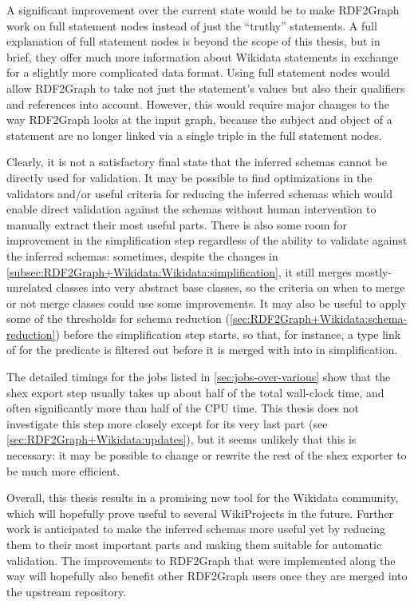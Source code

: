 A significant improvement over the current state
would be to make \gls{RDF2Graph} work on full \gls{statement} nodes instead of just the “truthy” \glspl{statement}.
A full explanation of full \gls{statement} nodes is beyond the scope of this thesis,
but in brief, they offer much more information about \gls{Wikidata} \glspl{statement}
in exchange for a slightly more complicated data format.
Using full \gls{statement} nodes would allow \gls{RDF2Graph} to take not just the \gls{statement}’s values
but also their \glspl{qualifier} and \glspl{reference} into account.
However, this would require major changes to the way \gls{RDF2Graph} looks at the input graph,
because the \gls{subject} and \gls{object} of a \gls{statement} are no longer linked via a single \gls{triple}
in the full \gls{statement} nodes.

Clearly, it is not a satisfactory final state
that the inferred \glspl{schema} cannot be directly used for validation.
It may be possible to find optimizations in the validators
and/or useful criteria for reducing the inferred \glspl{schema}
which would enable direct validation against the \glspl{schema}
without human intervention to manually extract their most useful parts.
There is also some room for improvement in the simplification step
regardless of the ability to validate against the inferred \glspl{schema}:
sometimes, despite the changes in \cref{subsec:RDF2Graph+Wikidata:Wikidata:simplification},
it still merges mostly-unrelated classes into very abstract base classes,
so the criteria on when to merge or not merge classes could use some improvements.
It may also be useful to apply some of the thresholds for schema reduction (\cref{sec:RDF2Graph+Wikidata:schema-reduction})
before the simplification step starts,
so that, for instance,
a \gls{type link} of  for the  \gls{predicate}
is filtered out before it is merged with  into  in simplification.

The detailed timings for the jobs listed in \cref{sec:jobs-over-various}
show that the \gls{shex} export step usually takes up about half of the total wall-clock time,
and often significantly more than half of the CPU time.
This thesis does not investigate this step more closely except for its very last part
(see \cref{sec:RDF2Graph+Wikidata:updates}),
but it seems unlikely that this is necessary:
it may be possible to change or rewrite the rest of the \gls{shex} exporter to be much more efficient.

Overall, this thesis results in a promising new tool for the \gls{Wikidata} community,
which will hopefully prove useful to several WikiProjects in the future.
Further work is anticipated to make the inferred \glspl{schema} more useful yet
by reducing them to their most important parts and making them suitable for automatic validation.
The improvements to \gls{RDF2Graph} that were implemented along the way
will hopefully also benefit other \gls{RDF2Graph} users
once they are merged into the upstream repository.
